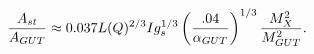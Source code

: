 \begin{equation}\label{ampcompar}
{A_{st}\over A_{GUT}} \approx 0.037 L(Q)^{2/3}I
g_{s}^{1/3}\left(.04\over \alpha_{GUT}\right)^{1/3}{M_X^2\over
M_{GUT}^2}.
\end{equation}

